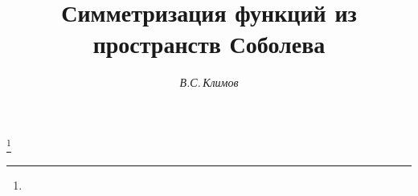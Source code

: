 

 




\newcommand{\la}{\langle} 


\newcommand{\ra}{\rangle} 


\newcommand{\mes}{\operatorname{mes}} 


\newcommand{\ord}{\operatorname{ord}} 


\newcommand{\supp}{\operatorname{supp}} 


\newcommand{\tts}[1]{}  


 


 




\setcounter{page}{45} 












 


\author{\it В.С.\,Климов} 




\title{Симметризация функций из пространств Соболева} 


\thanks{} 


 


\date{} 




\pagestyle{plain} %


 




